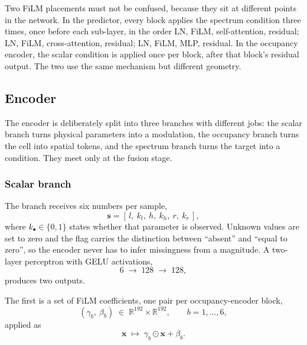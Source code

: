\documentclass[pdflatex,oneside,sn-mathphys-num]{sn-jnl}
\theoremstyle{thmstyleone}
\theoremstyle{thmstyletwo}
\theoremstyle{thmstylethree}
\begin{document}
Two FiLM placements must not be confused, because they sit at different points in the
network. In the predictor, every block applies the spectrum condition three times, once
before each sub-layer, in the order LN, FiLM, self-attention, residual; LN, FiLM,
cross-attention, residual; LN, FiLM, MLP, residual. In the occupancy encoder, the scalar
condition is applied once per block, after that block's residual output. The two use the
same mechanism but different geometry.

\subsection{Encoder}

The encoder is deliberately split into three branches with different jobs: the scalar
branch turns physical parameters into a modulation, the occupancy branch turns the cell
into spatial tokens, and the spectrum branch turns the target into a condition. They
meet only at the fusion stage.

\subsubsection{Scalar branch}
The branch receives six numbers per sample,
\begin{equation}
\mathbf{s} = [\, l,\ k_l,\ h,\ k_h,\ r,\ k_r \,],
\end{equation}
where $k_\bullet\in\{0,1\}$ states whether that parameter is observed. Unknown values are set to zero and the flag carries the
distinction between ``absent'' and ``equal to zero'', so the encoder never has to infer
missingness from a magnitude. A two-layer perceptron with GELU activations,
\begin{equation}
6 \;\longrightarrow\; 128 \;\longrightarrow\; 128,
\end{equation}
produces two outputs.

The first is a set of FiLM coefficients, one pair per occupancy-encoder block,
\begin{equation}
(\gamma_b,\ \beta_b) \;\in\; \mathbb{R}^{192}\times\mathbb{R}^{192},
\qquad b = 1,\dots,6,
\end{equation}
applied as
\begin{equation}
\mathbf{x} \;\mapsto\; \gamma_b\odot\mathbf{x}+\beta_b .
\end{equation}
\end{document}
